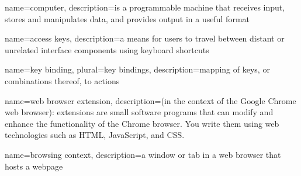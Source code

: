 {
  name=computer,
  description={is a programmable machine that receives input,
               stores and manipulates data, and provides
               output in a useful format}
}





{
  name=access keys,
  description={a means for users to travel between distant or unrelated interface components using keyboard shortcuts}
}

{
  name=key binding,
  plural=key bindings,
  description={mapping of keys, or combinations thereof, to actions}
}

{
  name=web browser extension,
  description={(in the context of the Google Chrome web browser): extensions are small software programs that can modify and enhance the functionality of the Chrome browser. You write them using web technologies such as HTML, JavaScript, and CSS.}
}

{
  name=browsing context,
  description={a window or tab in a web browser that hosts a webpage}
}